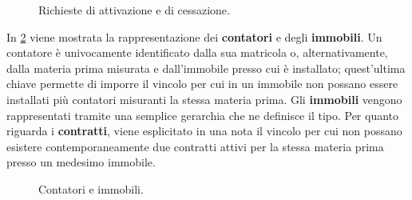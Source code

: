 \documentclass[a4paper,12pt]{report}
\begin{document}
\begin{figure}[H]
\centering{}
%
\caption{Richieste di attivazione e di cessazione.}
\label{fig:requests-activation}
\end{figure}


In \cref{fig:meters_premises} viene mostrata la rappresentazione dei \textbf{contatori} e degli \textbf{immobili}. Un contatore è univocamente identificato dalla sua matricola o, alternativamente, dalla materia prima misurata e dall'immobile presso cui è installato; quest'ultima chiave permette di imporre il vincolo per cui in un immobile non possano essere installati più contatori misuranti la stessa materia prima.
\newline
Gli \textbf{immobili} vengono rappresentati tramite una semplice gerarchia che ne definisce il tipo.
\newline
Per quanto riguarda i \textbf{contratti}, viene esplicitato in una nota il vincolo per cui non possano esistere contemporaneamente due contratti attivi per la stessa materia prima presso un medesimo immobile.

\begin{figure}[H]
\centering{}
\caption{Contatori e immobili.}
\label{fig:meters_premises}
\end{figure}
\end{document}
